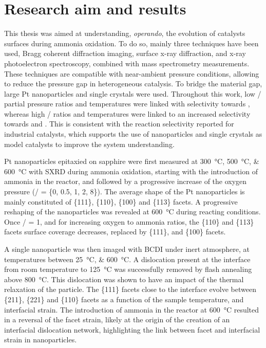 \section{Research aim and results}

This thesis was aimed at understanding, \textit{operando}, the evolution of catalysts surfaces during ammonia oxidation.
To do so, mainly three techniques have been used, Bragg coherent diffraction imaging, surface x-ray diffraction, and x-ray photoelectron spectroscopy, combined with mass spectrometry measurements.
These techniques are compatible with near-ambient pressure conditions, allowing to reduce the pressure gap in heterogeneous catalysis.
To bridge the material gap, large Pt nanoparticles and single crystals were used.
Throughout this work, low / partial pressure ratios and temperatures were linked with selectivity towards , whereas high / ratios and temperatures were linked to an increased selectivity towards  and .
This is consistent with the reaction selectivity reported for industrial catalysts, which supports the use of nanoparticles and single crystals as model catalysts to improve the system understanding.

Pt nanoparticles epitaxied on sapphire were first measured at \qtylist{300;500;600}{\degreeCelsius} with SXRD during ammonia oxidation, starting with the introduction of ammonia in the reactor, and followed by a progressive increase of the oxygen pressure (/ = \{0, 0.5, 1, 2, 8\}).
The average shape of the Pt nanoparticles is mainly constituted of \{111\}, \{110\}, \{100\} and \{113\} facets.
A progressive reshaping of the nanoparticles was revealed at \qty{600}{\degreeCelsius} during reacting conditions.
Once / = 1, and for increasing oxygen to ammonia ratios, the \{110\} and \{113\} facets surface coverage decreases, replaced by \{111\}, and \{100\} facets.

A single nanoparticle was then imaged with BCDI under inert atmosphere, at temperatures between \qtylist{25;600}{\degreeCelsius}.
A dislocation present at the interface from room temperature to \qty{125}{\degreeCelsius} was successfully removed by flash annealing above \qty{800}{\degreeCelsius}.
This dislocation was shown to have an impact of the thermal relaxation of the particle.
The \{111\} facets close to the interface evolve between \{211\}, \{221\} and \{110\} facets as a function of the sample temperature, and interfacial strain.
The introduction of ammonia in the reactor at \qty{600}{\degreeCelsius} resulted in a reversal of the facet strain, likely at the origin of the creation of an interfacial dislocation network, highlighting the link between facet and interfacial strain in nanoparticles.

